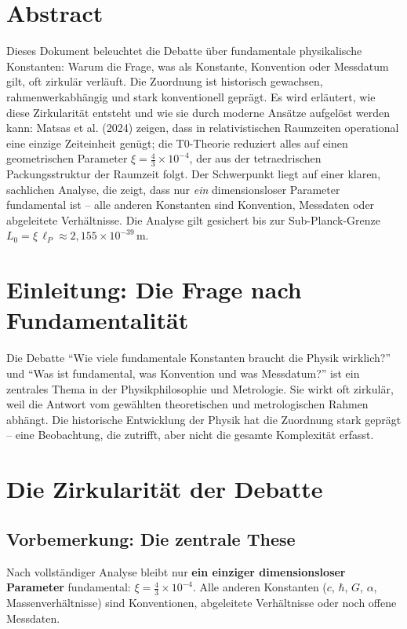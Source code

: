 \section*{Abstract}
	Dieses Dokument beleuchtet die Debatte über fundamentale physikalische Konstanten: Warum die Frage, was als Konstante, Konvention oder Messdatum gilt, oft zirkulär verläuft. Die Zuordnung ist historisch gewachsen, rahmenwerkabhängig und stark konventionell geprägt. Es wird erläutert, wie diese Zirkularität entsteht und wie sie durch moderne Ansätze aufgelöst werden kann: Matsas et al. (2024) zeigen, dass in relativistischen Raumzeiten operational eine einzige Zeiteinheit genügt; die T0-Theorie reduziert alles auf einen geometrischen Parameter \(\xi = \frac{4}{3} \times 10^{-4}\), der aus der tetraedrischen Packungsstruktur der Raumzeit folgt. Der Schwerpunkt liegt auf einer klaren, sachlichen Analyse, die zeigt, dass nur \emph{ein} dimensionsloser Parameter fundamental ist -- alle anderen Konstanten sind Konvention, Messdaten oder abgeleitete Verhältnisse. Die Analyse gilt gesichert bis zur Sub-Planck-Grenze \(L_0 = \xi \, \ell_P \approx 2{,}155 \times 10^{-39}\,\text{m}\).



	
	\section{Einleitung: Die Frage nach Fundamentalität}
	
	Die Debatte ``Wie viele fundamentale Konstanten braucht die Physik wirklich?'' und ``Was ist fundamental, was Konvention und was Messdatum?'' ist ein zentrales Thema in der Physikphilosophie und Metrologie. Sie wirkt oft zirkulär, weil die Antwort vom gewählten theoretischen und metrologischen Rahmen abhängt. Die historische Entwicklung der Physik hat die Zuordnung stark geprägt – eine Beobachtung, die zutrifft, aber nicht die gesamte Komplexität erfasst.
	
	\section{Die Zirkularität der Debatte}
	
	\subsection{Vorbemerkung: Die zentrale These}
	Nach vollständiger Analyse bleibt nur \textbf{ein einziger dimensionsloser Parameter} fundamental: \(\xi = \frac{4}{3} \times 10^{-4}\). Alle anderen Konstanten (\(c\), \(\hbar\), \(G\), \(\alpha\), Massenverhältnisse) sind Konventionen, abgeleitete Verhältnisse oder noch offene Messdaten.
	
